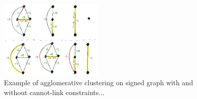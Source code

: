 


\begin{figure}
\centering
\includegraphics[width=0.45\textwidth,trim=0.in 0.in 0.in 0.in,clip]{./figs/cannot-lin-constraints.png}
\caption{\small 
Example of agglomerative clustering on signed graph with and without cannot-link constraints...
\label{fig:algorithm_with_without_CLC}}
\end{figure}

